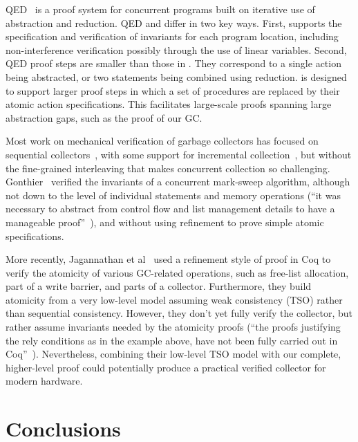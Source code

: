 QED~\cite{ElmasQT09} is a proof system for concurrent programs built on iterative use of abstraction and reduction. QED and \civl differ in two key ways. First, \civl supports the specification and verification of invariants for each program location, including non-interference verification possibly through the use of linear variables. Second, QED proof steps are smaller than those in \civl. They correspond to a single action being abstracted, or two statements being combined using reduction. \civl is designed to support larger proof steps in which a set of procedures are replaced by their atomic action specifications. This facilitates large-scale proofs spanning large abstraction gaps, such as the proof of our GC.

Most work on mechanical verification of garbage collectors has focused on sequential collectors~\cite{mccr07,hawb09},
with some support for incremental collection~\cite{mccr07},
but without the fine-grained interleaving that makes concurrent collection so challenging.
Gonthier~\cite{gont96} verified the invariants of a concurrent mark-sweep algorithm,
although not down to the level of individual statements and memory operations
(``it was necessary to abstract from control flow and list management details to have a manageable proof''~\cite{gont96}),
and without using refinement to prove simple atomic specifications.

More recently,
Jagannathan et al~\cite{Jagannathan14} used a refinement style of proof in Coq to verify the atomicity of various GC-related operations,
such as free-list allocation,
part of a write barrier, and parts of a collector.
Furthermore, they build atomicity from a very low-level model assuming weak consistency (TSO) rather than sequential consistency.
However, they don't yet fully verify the collector,
but rather assume invariants needed by the atomicity proofs
(``the proofs justifying the rely conditions as in the example above,
have not been fully carried out in Coq''~\cite{Jagannathan14}).
Nevertheless, combining their low-level TSO model with our complete,
higher-level proof could potentially produce a practical verified collector for modern hardware.

\section{Conclusions}

